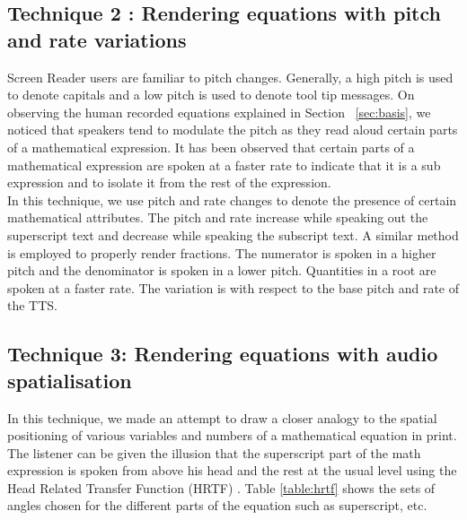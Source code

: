 \documentclass{article}
\begin{document}
\subsection{Technique 2 : Rendering equations with pitch and rate variations}
\label{ssec:t2}

Screen Reader users are familiar to pitch changes. Generally, a high pitch is used to denote capitals and a low pitch is used to denote tool tip messages. On observing the human recorded equations explained in Section ~\ref{sec:basis}, we noticed that speakers tend to modulate the pitch as they read aloud certain parts of a mathematical expression. It has been observed that certain parts of a mathematical expression are spoken at a faster rate to indicate that it is a sub expression and to isolate it from the rest of the expression. \\

In this technique, we use pitch and rate changes to denote the presence of certain mathematical attributes. The pitch and rate increase while speaking out the superscript text and decrease while speaking the subscript text. A similar method is employed to properly render fractions. The numerator is spoken in a higher pitch and the denominator is spoken in a lower pitch. Quantities in a root are spoken at a faster rate. The variation is with respect to the base pitch and rate of the TTS.


\subsection{Technique 3: Rendering equations with audio spatialisation}
\label{ssec:t3}
In this technique, we made an attempt to draw a closer analogy to the spatial positioning of various variables and numbers of a mathematical equation in print. The listener can be given the illusion that the superscript part of the math expression is spoken from above his head and the rest at the usual level using the Head Related Transfer Function (HRTF) \cite{geronazzo2011head}.
Table 
\ref{table:hrtf} shows the sets of angles chosen for the different parts of the equation such as superscript, etc. 
\end{document}
